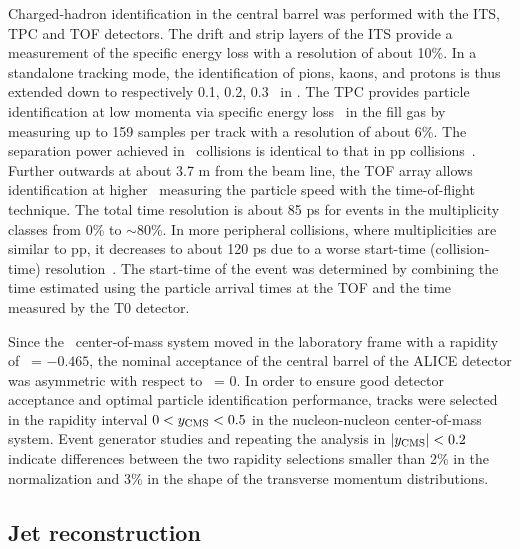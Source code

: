 Charged-hadron identification in the central barrel was performed with the ITS, TPC and TOF detectors. The drift and strip layers of the ITS provide a measurement of the specific energy loss with a resolution of about 10\%. In a standalone tracking mode, the identification of pions, kaons, and protons is thus extended down to respectively 0.1, 0.2, 0.3 \gevc\ in \pt. The TPC provides particle identification at low momenta via specific energy loss \dedx\ in the fill gas by measuring up to 159 samples per track with a resolution of about 6\%. The separation power achieved in \pPb\ collisions is identical to that in pp collisions~\cite{Abelev:2014ffa}. Further outwards at about 3.7 m from the beam line, the TOF array allows identification at higher \pt\ measuring the particle speed with the time-of-flight technique. The total time resolution is about 85 ps for events in the multiplicity classes from 0\% to $\sim 80$\%.  In more peripheral collisions, where multiplicities are similar to pp, it decreases to about 120 ps due to a worse start-time (collision-time) resolution~\cite{Abelev:2014ffa}. The start-time of the event was determined by combining the time estimated using the particle arrival times at the TOF and the time measured by the T0 detector.

Since the \pPb\ center-of-mass system moved in the laboratory frame with a rapidity of \ynn\ = $-0.465$, the nominal acceptance of the central barrel of the ALICE detector was asymmetric with respect to \ycms\ = 0.  In order to ensure good detector acceptance and optimal particle identification performance, tracks were selected in the rapidity interval $0 < y_{\rm CMS} < 0.5$ in the nucleon-nucleon center-of-mass system. Event generator studies and repeating the analysis in $\left|y_{\rm CMS}\right| < 0.2$ indicate differences between the two rapidity selections smaller than 2\% in the normalization and 3\% in the shape of the transverse momentum distributions.

\subsection{Jet reconstruction}

